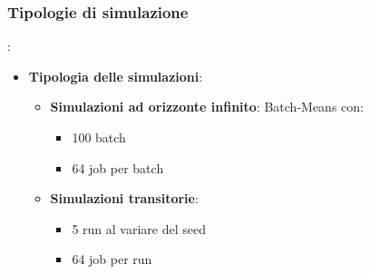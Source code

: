 \subsubsection{Tipologie di simulazione}
\begin{frame}{\subsecname: \subsubsecname}
    \begin{itemize}
        \item \textbf{Tipologia delle simulazioni}:
        \begin{itemize}
            \item \textbf{Simulazioni ad orizzonte infinito}: Batch-Means con:
            \begin{itemize}
                \item 100 batch
                \item 64 job per batch
            \end{itemize}
            \item \textbf{Simulazioni transitorie}:
            \begin{itemize}
                \item 5 run al variare del seed 
                \item 64 job per run
            \end{itemize}
        \end{itemize}
    \end{itemize}
\end{frame}

